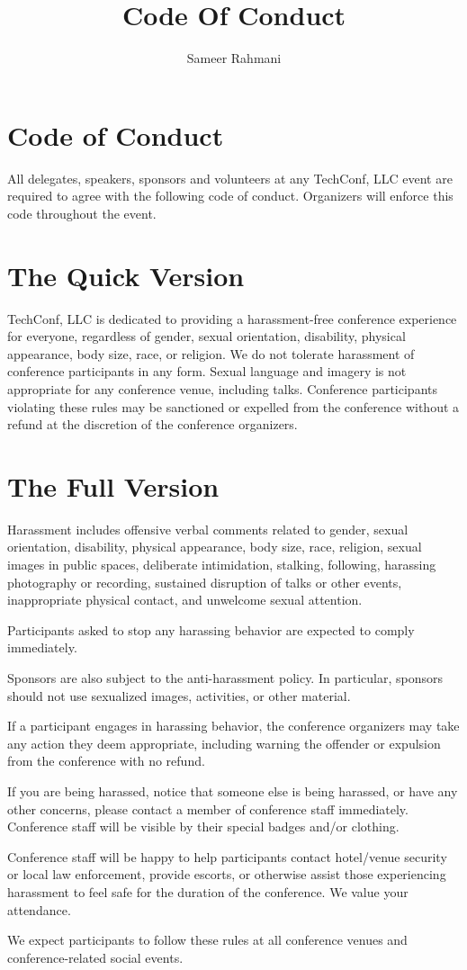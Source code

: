 \documentclass[a4paper,12pt]{article}
\author{Sameer Rahmani}
\title{Code Of Conduct}
\begin{document}
\maketitle
\newpage
\section*{Code of Conduct}
All delegates, speakers, sponsors and volunteers at any TechConf, LLC event are
required to agree with the following code of conduct. Organizers will enforce this
code throughout the event.

\section{The Quick Version}
TechConf, LLC is dedicated to providing a harassment-free conference experience for
everyone, regardless of gender, sexual orientation, disability, physical appearance,
body size, race, or religion. We do not tolerate harassment of conference participants
in any form. Sexual language and imagery is not appropriate for any conference venue,
including talks. Conference participants violating these rules may be sanctioned or
expelled from the conference without a refund at the discretion of the conference organizers.

\section{The Full Version}
Harassment includes offensive verbal comments related to gender, sexual orientation,
disability, physical appearance, body size, race, religion, sexual images in public
spaces, deliberate intimidation, stalking, following, harassing photography or recording,
sustained disruption of talks or other events, inappropriate physical contact, and unwelcome
sexual attention.

Participants asked to stop any harassing behavior are expected to comply immediately.

Sponsors are also subject to the anti-harassment policy. In particular, sponsors should not
use sexualized images, activities, or other material.

If a participant engages in harassing behavior, the conference organizers may take any action
they deem appropriate, including warning the offender or expulsion from the conference with no refund.

If you are being harassed, notice that someone else is being harassed, or have any other concerns,
please contact a member of conference staff immediately. Conference staff will be visible by their
special badges and/or clothing.

Conference staff will be happy to help participants contact hotel/venue security or local law
enforcement, provide escorts, or otherwise assist those experiencing harassment to feel safe for
the duration of the conference. We value your attendance.

We expect participants to follow these rules at all conference venues and conference-related social events.
\end{document}
